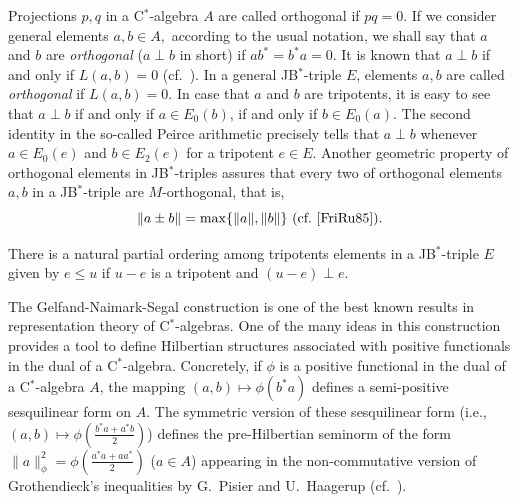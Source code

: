 \documentclass[10pt]{amsart}
\begin{document}
	Projections $p,q$ in a C$^*$-algebra $A$ are called orthogonal if $p q =0.$ If we consider general elements $a,b\in A,$ according to the usual notation, we shall say that $a$ and $b$ are \emph{orthogonal} ($a\perp b$ in short)  if $a b^* = b^* a= 0$. It is known that $a\perp b$ if and only if $L(a,b)=0$ (cf.\ \cite[Lemma 1]{BurFerGarMarPe08}). In a general JB$^*$-triple $E$, elements $a,b$ are called \emph{orthogonal} if $L(a,b) =0$. In case that $a$ and $b$ are tripotents, it is easy to see that $a\perp b$ if and only if $a\in E_0(b)$, if and only if $b\in E_0(a)$. The second identity in the so-called Peirce arithmetic precisely tells that $a\perp b$ whenever $a\in E_0(e)$ and $b\in E_2(e)$ for a tripotent $e\in E.$ Another geometric property of orthogonal elements in JB$^*$-triples assures that every two of orthogonal elements $a,b$ in a JB$^*$-triple are $M$-orthogonal, that is, \begin{equation}\label{eq M-orhtogonality} \hbox{$\|a\pm b\| = \max\{\|a\|,\|b\|\}$ (cf.\ \cite[Lemma 1.3$(a)$]{FriRu85}).}
	\end{equation}
	
	There is a natural partial ordering among tripotents elements in a JB$^*$-triple $E$ given by $e\leq u$ if $u-e$ is a tripotent and $(u-e)\perp e.$
	
	The Gelfand-Naimark-Segal construction is one of the best known results in representation theory of C$^*$-algebras. One of the many ideas in this construction provides a tool to define Hilbertian structures associated with positive functionals in the dual of a C$^*$-algebra. Concretely, if $\phi$ is a positive functional in the dual of a C$^*$-algebra $A$, the mapping $(a,b)\longmapsto \phi (b^* a)$ defines a semi-positive sesquilinear form on $A$. The symmetric version of these sesquilinear form (i.e., $(a,b)\longmapsto \phi (\frac{b^* a + a^* b}{2})$) defines the pre-Hilbertian seminorm of the form $\|a\|_{\phi}^2 = \phi (\frac{a^* a + a a^*}{2})$ ($a\in A$) appearing in the non-commutative version of Grothendieck's inequalities by G.~Pisier and U.~Haagerup (cf.\ \cite{Pi78, Haa85, Pi2012}).
	
\end{document}

